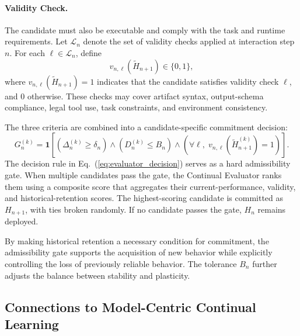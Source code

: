 \documentclass{article}
\begin{document}
\paragraph{Validity Check.}
The candidate must also be executable and comply with the task and runtime
requirements. Let $\mathcal{L}_n$ denote the set of validity checks applied at
interaction step $n$. For each $\ell \in \mathcal{L}_n$, define
\begin{equation}
\label{eq:evaluator_validity}
v_{n,\ell}\left(\widetilde{H}_{n+1}\right)\in\{0,1\},
\end{equation}
where $v_{n,\ell}\left(\widetilde{H}_{n+1}\right)=1$ indicates that the
candidate satisfies validity check $\ell$, and $0$ otherwise. These checks may
cover artifact syntax, output-schema compliance, legal tool use, task
constraints, and environment consistency.

The three criteria are combined into a candidate-specific commitment
decision:
\begin{equation}
\label{eq:evaluator_decision}
G_n^{(k)}
=
\mathbf{1}
\left[
(\Delta_n^{(k)} \geq \delta_n)
\land
(D_n^{(k)} \leq B_n)
\land
\left(
\forall \ell,\;
v_{n,\ell}\left(\widetilde{H}_{n+1}^{(k)}\right)=1
\right)
\right].
\end{equation}
The decision rule in Eq.~(\ref{eq:evaluator_decision}) serves as a hard admissibility gate. When multiple candidates pass the gate, the Continual Evaluator ranks them using a composite score that aggregates their current-performance, validity, and historical-retention scores. The highest-scoring candidate is committed as $H_{n+1}$, with ties broken randomly. If no candidate passes the gate, $H_n$ remains deployed.

By making historical retention a necessary condition for commitment, the
admissibility gate supports the acquisition of new behavior while explicitly
controlling the loss of previously reliable behavior. The tolerance $B_n$
further adjusts the balance between stability and plasticity.

\subsection{Connections to Model-Centric Continual Learning}
\label{sec:hcl_model_cl}
\end{document}
